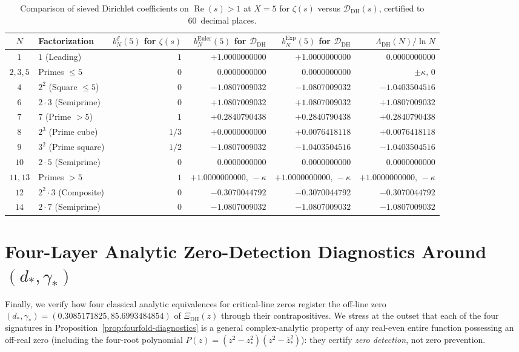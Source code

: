 \documentclass[11pt,reqno]{amsart}
\theoremstyle{definition}
\theoremstyle{remark}
\numberwithin{equation}{section}
\DeclareMathOperator{\Reop}{Re}
\begin{document}
\begin{table}[htbp]
\centering
\caption{Comparison of sieved Dirichlet coefficients on $\Reop(s) > 1$ at $X = 5$ for $\zeta(s)$ versus $\mathcal{D}_{\mathrm{DH}}(s)$, certified to 60~decimal places.}
\label{tab:sieved-coeffs}
{\footnotesize\setlength{\tabcolsep}{4pt}%
\begin{tabular}{@{}clrrrr@{}}
\toprule
$N$ & Factorization & $b_N^{\mathcal{E}}(5)$ for $\zeta(s)$ & $b_N^{\mathrm{Euler}}(5)$ for $\mathcal{D}_{\mathrm{DH}}$ & $b_N^{\mathrm{Exp}}(5)$ for $\mathcal{D}_{\mathrm{DH}}$ & $\Lambda_{\mathrm{DH}}(N)/\ln N$ \\
\midrule
$1$ & $1$ (Leading) & $1$ & $+1.0000000000$ & $+1.0000000000$ & $0.0000000000$ \\
$2,3,5$ & Primes $\le 5$ & $0$ & $0.0000000000$ & $0.0000000000$ & $\pm\kappa,\,0$ \\
$4$ & $2^2$ (Square $\le 5$) & $0$ & $-1.0807009032$ & $-1.0807009032$ & $-1.0403504516$ \\
$6$ & $2\cdot 3$ (Semiprime) & $0$ & $+1.0807009032$ & $+1.0807009032$ & $+1.0807009032$ \\
$7$ & $7$ (Prime $>5$) & $1$ & $+0.2840790438$ & $+0.2840790438$ & $+0.2840790438$ \\
$8$ & $2^3$ (Prime cube) & $1/3$ & $+0.0000000000$ & $+0.0076418118$ & $+0.0076418118$ \\
$9$ & $3^2$ (Prime square) & $1/2$ & $-1.0807009032$ & $-1.0403504516$ & $-1.0403504516$ \\
$10$ & $2\cdot 5$ (Semiprime) & $0$ & $0.0000000000$ & $0.0000000000$ & $0.0000000000$ \\
$11,13$ & Primes $>5$ & $1$ & $+1.0000000000,\, -\kappa$ & $+1.0000000000,\, -\kappa$ & $+1.0000000000,\, -\kappa$ \\
$12$ & $2^2\cdot 3$ (Composite) & $0$ & $-0.3070044792$ & $-0.3070044792$ & $-0.3070044792$ \\
$14$ & $2\cdot 7$ (Semiprime) & $0$ & $-1.0807009032$ & $-1.0807009032$ & $-1.0807009032$ \\
\bottomrule
\end{tabular}%
}
\end{table}

\section{Four-Layer Analytic Zero-Detection Diagnostics Around $(d_*, \gamma_*)$}
\label{sec:diagnostics}

Finally, we verify how four classical analytic equivalences for critical-line zeros register the off-line zero $(d_*,\gamma_*) = (0.3085171825, 85.6993484854)$ of $\Xi_{\mathrm{DH}}(z)$ through their contrapositives. We stress at the outset that each of the four signatures in Proposition~\ref{prop:fourfold-diagnostics} is a general complex-analytic property of any real-even entire function possessing an off-real zero (including the four-root polynomial $P(z) = (z^2 - z_*^2)(z^2 - \bar{z}_*^2)$): they certify \emph{zero detection}, not zero prevention.
\end{document}
